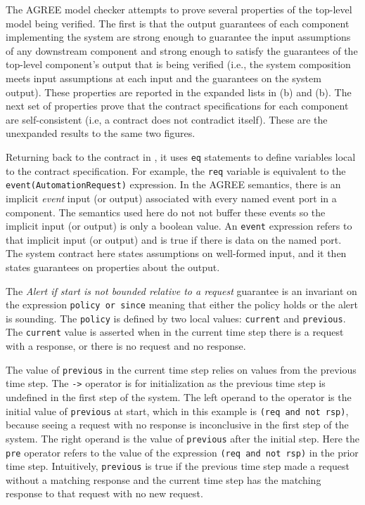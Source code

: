 The AGREE model checker attempts to prove several properties of the top-level model being verified. The first is that the output guarantees of each component implementing the system are strong enough to guarantee the input assumptions of any downstream component and strong enough to satisfy the guarantees of the top-level component's output that is being verified (i.e., the system composition meets input assumptions at each input and the guarantees on the system output). These properties are reported in the expanded lists in (b) and (b).  The next set of properties prove that the contract specifications for each component are self-consistent (i.e, a contract does not contradict itself). These are the unexpanded results to the same two figures.

Returning back to the contract in , it uses \texttt{eq} statements to define variables local to the contract specification. For example, the \texttt{req} variable is equivalent to the \texttt{event(AutomationRequest)} expression. In the AGREE semantics, there is an implicit \emph{event} input (or output) associated with every named event port in a component. The semantics used here do not not buffer these events so the implicit input (or output) is only a boolean value. An \texttt{event} expression refers to that implicit input (or output) and is true if there is data on the named port. The system contract here states assumptions on well-formed input, and it then states guarantees on properties about the output.

The \emph{Alert if start is not bounded relative to a request} guarantee is an invariant on the expression \texttt{policy or since} meaning that either the policy holds or the alert is sounding. The \texttt{policy} is defined by two local values: \texttt{current} and \texttt{previous}. The \texttt{current} value is asserted when in the current time step there is a request with a response, or there is no request and no response.  

The value of \texttt{previous} in the current time step relies on values from the previous time step. The \texttt{->} operator is for initialization as the previous time step is undefined in the first step of the system. The left operand to the operator is the initial value of \texttt{previous} at start, which in this example is \texttt{(req and not rsp)}, because seeing a request with no response is inconclusive in the first step of the system. The right operand is the value of \texttt{previous} after the initial step. Here the \texttt{pre} operator refers to the value of the expression \texttt{(req and not rsp)} in the prior time step. Intuitively, \texttt{previous} is true if the previous time step made a request without a matching response and the current time step has the matching response to that request with no new request.


